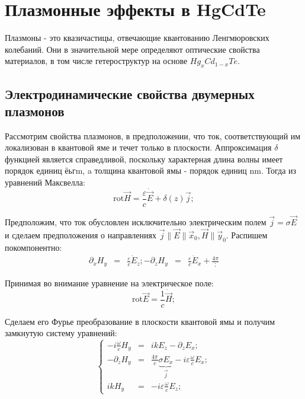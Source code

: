 \documentclass[../main.tex]{subfiles}
\newcommand{\rot}{\text{rot}}
\begin{document}
    \chapter{Плазмонные эффекты в HgCdTe}
    
    Плазмоны - это квазичастицы, отвечающие квантованию 
    Ленгмюровских колебаний. Они в значительной мере 
    определяют оптические свойства материалов, в том числе 
    гетероструктур на основе $Hg_xCd_{1-x}Te$.

    \section{Электродинамические свойства двумерных плазмонов}

    Рассмотрим свойства плазмонов, в предположении, что ток,
    соответствующий им локализован в квантовой яме и течет только
    в плоскости. Аппроксимация $\delta$ функцией является 
    справедливой, поскольку характерная длина волны имеет порядок 
    единиц $ёьг\text{m}$, a толщина квантовой ямы - порядок единиц 
    $\text{nm}$. Тогда из уравнений Максвелла:
    \begin{equation}
        \rot \vec H = \frac{\varepsilon}{c} \dot{\vec E} + \delta(z) \vec j;
    \end{equation}

    Предположим, что ток обусловлен исключительно электрическим полем
    $\vec j  = \sigma \vec E$ и сделаем предположения о направлениях 
    $\vec j \parallel \vec E \parallel \vec{x}_0, \vec H \parallel \vec{y}_0$.
    Распишем покомпонентно:
    \begin{equation}
        \begin{aligned}
            \partial_x H_y &=& \frac{\varepsilon}{c} \dot{E}_z;
            -\partial_z H_y &=& \frac{\varepsilon}{c} \dot{E}_x + \frac{4\pi };
        \end{aligned}
    \end{equation}

    Принимая во внимание уравнение на электрическое поле:
    \begin{equation}
        \rot \vec E = \frac{1}{c} \dot \vec H;
    \end{equation}

    Сделаем его Фурье преобразование в плоскости квантовой ямы
    и получим замкнутую систему уравнений:
    \begin{equation}
        \left\{
        \begin{aligned}
            - i \frac{\omega}{c} H_y &=& i k E_z - \partial_z E_x;\\
            - \partial_z H_y  &=& \frac{4\pi}{c} \underbrace{\sigma E_x}_{\vec j} 
            - i \varepsilon  \frac{\omega}{c} E_x;\\
            ik H_y  &=& - i \varepsilon \frac{\omega}{c} E_z;
        \end{aligned}
        \right.
    \end{equation}
\end{document}
